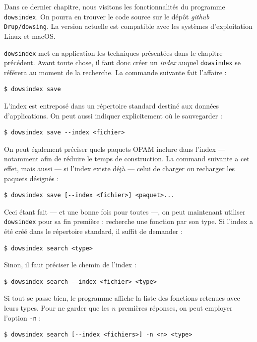 \documentclass[a4paper]{report}
\theoremstyle{definition}
\newcommand{\dowsindex}{\texttt{dowsindex}\xspace}
\begin{document}
Dans ce dernier chapitre, nous visitons les fonctionnalités du programme \dowsindex. On pourra en trouver le code source sur le dépôt \textit{github} \texttt{Drup/dowsing}. La version actuelle est compatible avec les systèmes d'exploitation Linux et macOS.

\dowsindex met en application les techniques présentées dans le chapitre précédent. Avant toute chose, il faut donc créer un \emph{index} auquel \dowsindex se référera au moment de la recherche. La commande suivante fait l'affaire :

\begin{verbatim}
$ dowsindex save
\end{verbatim}

L'index est entreposé dans un répertoire standard destiné aux données d'applications. On peut aussi indiquer explicitement où le sauvegarder :

\begin{verbatim}
$ dowsindex save --index <fichier>
\end{verbatim}

On peut également préciser quels paquets OPAM inclure dans l'index — notamment afin de réduire le temps de construction. La command suivante a cet effet, mais aussi — si l'index existe déjà — celui de charger ou recharger les paquets désignés :

\begin{verbatim}
$ dowsindex save [--index <fichier>] <paquet>...
\end{verbatim}

Ceci étant fait — et une bonne fois pour toutes —, on peut maintenant utiliser \dowsindex pour sa fin première : recherche une fonction par son type. Si l'index a été créé dans le répertoire standard, il suffit de demander :

\begin{verbatim}
$ dowsindex search <type>
\end{verbatim}

Sinon, il faut préciser le chemin de l'index :

\begin{verbatim}
$ dowsindex search --index <fichier> <type>
\end{verbatim}

Si tout se passe bien, le programme affiche la liste des fonctions retenues avec leurs types. Pour ne garder que les $n$ premières réponses, on peut employer l'option \texttt{-n} :

\begin{verbatim}
$ dowsindex search [--index <fichiers>] -n <n> <type>
\end{verbatim}
\end{document}
